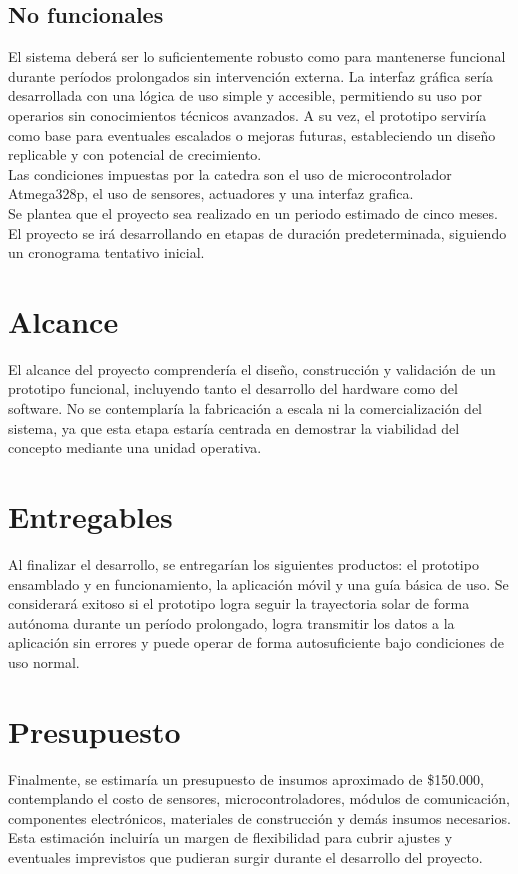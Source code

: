 \documentclass[a4paper,12pt]{article}
\begin{document}
\subsection{No funcionales}
El sistema deberá ser lo suficientemente robusto como para mantenerse funcional durante períodos prolongados sin intervención externa. La interfaz gráfica sería desarrollada con una lógica de uso simple y accesible, permitiendo su uso por operarios sin conocimientos técnicos avanzados. A su vez, el prototipo serviría como base para eventuales escalados o mejoras futuras, estableciendo un diseño replicable y con potencial de crecimiento.\\
Las condiciones impuestas por la catedra son el uso de microcontrolador Atmega328p, el uso de sensores, actuadores y una interfaz grafica.\\
Se plantea que el proyecto sea realizado en un periodo estimado de cinco meses. El proyecto se irá desarrollando en etapas de duración predeterminada, siguiendo un cronograma tentativo inicial.\\

\section{Alcance}
El alcance del proyecto comprendería el diseño, construcción y validación de un prototipo funcional, incluyendo tanto el desarrollo del hardware como del software. No se contemplaría la fabricación a escala ni la comercialización del sistema, ya que esta etapa estaría centrada en demostrar la viabilidad del concepto mediante una unidad operativa.\\

\section{Entregables}
Al finalizar el desarrollo, se entregarían los siguientes productos: el prototipo ensamblado y en funcionamiento, la aplicación móvil y una guía básica de uso.
Se considerará exitoso si el prototipo logra seguir la trayectoria solar de forma autónoma durante un período prolongado, logra transmitir los datos a la aplicación sin errores y puede operar de forma autosuficiente bajo condiciones de uso normal.\\

\section{Presupuesto}
Finalmente, se estimaría un presupuesto de insumos aproximado de \$150.000, contemplando el costo de sensores, microcontroladores, módulos de comunicación, componentes electrónicos, materiales de construcción y demás insumos necesarios. Esta estimación incluiría un margen de flexibilidad para cubrir ajustes y eventuales imprevistos que pudieran surgir durante el desarrollo del proyecto.\\
\end{document}
